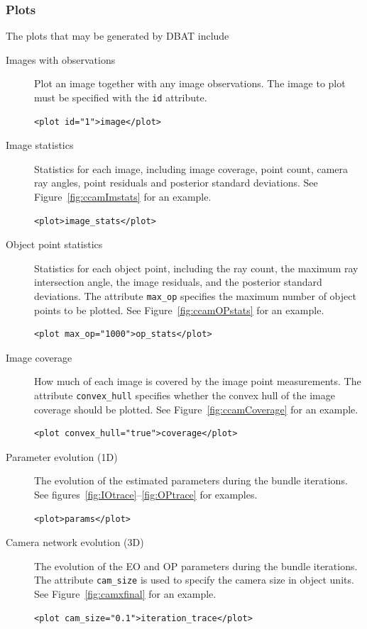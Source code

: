 \documentclass{article}
\begin{document}
\subsubsection{Plots}
\label{sec:plots}
The plots that may be generated by DBAT include
\begin{description}
\item[{Images with observations}] Plot an image together with any image
observations. The image to plot must be specified with the \texttt{id} attribute.
\begin{verbatim}
<plot id="1">image</plot>
\end{verbatim}
\item[{Image statistics}] Statistics for each image, including image
coverage, point count, camera ray angles, point residuals and
posterior standard deviations. See Figure~\ref{fig:ccamImstats} for
an example.
\begin{verbatim}
<plot>image_stats</plot>
\end{verbatim}
\item[{Object point statistics}] Statistics for each object point,
including the ray count, the maximum ray intersection angle, the
image residuals, and the posterior standard deviations. The
attribute \texttt{max\_op} specifies the maximum number of object points
to be plotted. See Figure~\ref{fig:ccamOPstats} for an example.
\begin{verbatim}
<plot max_op="1000">op_stats</plot>
\end{verbatim}
\item[{Image coverage}] How much of each image is covered by the image
point measurements. The attribute \texttt{convex\_hull}
specifies whether the convex hull of the image
coverage should be plotted. See
Figure~\ref{fig:ccamCoverage} for an example.
\begin{verbatim}
<plot convex_hull="true">coverage</plot>
\end{verbatim}
\item[{Parameter evolution (1D)}] The evolution of the estimated
parameters during the bundle iterations. See
figures~\ref{fig:IOtrace}--\ref{fig:OPtrace} for examples.
\begin{verbatim}
<plot>params</plot>
\end{verbatim}
\item[{Camera network evolution (3D)}] The evolution of the EO and OP
parameters during the bundle iterations. The attribute \texttt{cam\_size}
is used to specify the camera size in object units. See
Figure~\ref{fig:camxfinal} for an example.
\begin{verbatim}
<plot cam_size="0.1">iteration_trace</plot>
\end{verbatim}
\end{description}
\end{document}
